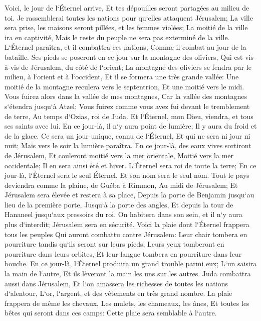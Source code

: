 \verse Voici, le jour de l`Éternel arrive, Et tes dépouilles seront partagées au milieu de toi. 
\verse Je rassemblerai toutes les nations pour qu`elles attaquent Jérusalem; La ville sera prise, les maisons seront pillées, et les femmes violées; La moitié de la ville ira en captivité, Mais le reste du peuple ne sera pas exterminé de la ville. 
\verse L`Éternel paraîtra, et il combattra ces nations, Comme il combat au jour de la bataille. 
\verse Ses pieds se poseront en ce jour sur la montagne des oliviers, Qui est vis-à-vis de Jérusalem, du côté de l`orient; La montagne des oliviers se fendra par le milieu, à l`orient et à l`occident, Et il se formera une très grande vallée: Une moitié de la montagne reculera vers le septentrion, Et une moitié vers le midi. 
\verse Vous fuirez alors dans la vallée de mes montagnes, Car la vallée des montagnes s`étendra jusqu`à Atzel; Vous fuirez comme vous avez fui devant le tremblement de terre, Au temps d`Ozias, roi de Juda. Et l`Éternel, mon Dieu, viendra, et tous ses saints avec lui. 
\verse En ce jour-là, il n`y aura point de lumière; Il y aura du froid et de la glace. 
\verse Ce sera un jour unique, connu de l`Éternel, Et qui ne sera ni jour ni nuit; Mais vers le soir la lumière paraîtra. 
\verse En ce jour-là, des eaux vives sortiront de Jérusalem, Et couleront moitié vers la mer orientale, Moitié vers la mer occidentale; Il en sera ainsi été et hiver. 
\verse L`Éternel sera roi de toute la terre; En ce jour-là, l`Éternel sera le seul Éternel, Et son nom sera le seul nom. 
\verse Tout le pays deviendra comme la plaine, de Guéba à Rimmon, Au midi de Jérusalem; Et Jérusalem sera élevée et restera à sa place, Depuis la porte de Benjamin jusqu`au lieu de la première porte, Jusqu`à la porte des angles, Et depuis la tour de Hananeel jusqu`aux pressoirs du roi. 
\verse On habitera dans son sein, et il n`y aura plus d`interdit; Jérusalem sera en sécurité. 
\verse Voici la plaie dont l`Éternel frappera tous les peuples Qui auront combattu contre Jérusalem: Leur chair tombera en pourriture tandis qu`ils seront sur leurs pieds, Leurs yeux tomberont en pourriture dans leurs orbites, Et leur langue tombera en pourriture dans leur bouche. 
\verse En ce jour-là, l`Éternel produira un grand trouble parmi eux; L`un saisira la main de l`autre, Et ils lèveront la main les uns sur les autres. 
\verse Juda combattra aussi dans Jérusalem, Et l`on amassera les richesses de toutes les nations d`alentour, L`or, l`argent, et des vêtements en très grand nombre. 
\verse La plaie frappera de même les chevaux, Les mulets, les chameaux, les ânes, Et toutes les bêtes qui seront dans ces camps: Cette plaie sera semblable à l`autre. 
